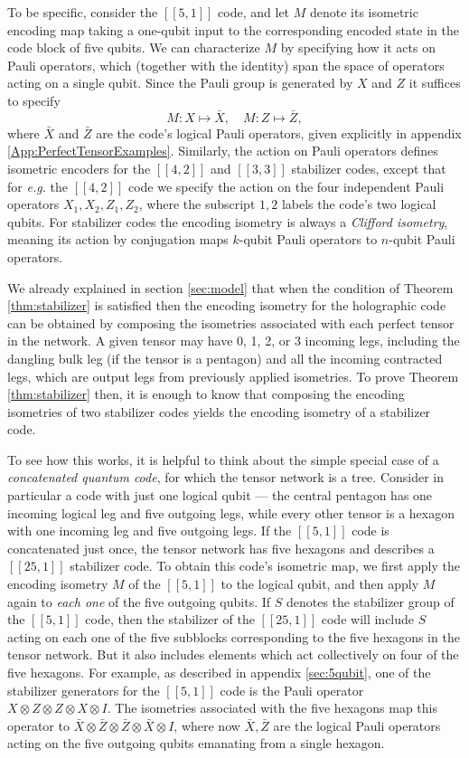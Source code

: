 \documentclass[12pt]{article}
\theoremstyle{plain}
\theoremstyle{plain}
\theoremstyle{plain}
\theoremstyle{plain}
\theoremstyle{result}
\theoremstyle{remark}
\theoremstyle{conjecture}
\theoremstyle{observation}
\theoremstyle{definition}
\theoremstyle{corollary}
\theoremstyle{definition}
\theoremstyle{definition}
\theoremstyle{assumption}
\theoremstyle{definition}
\theoremstyle{problem}
\theoremstyle{fact}
\newcommand{\be}{\begin{equation}}
\newcommand{\ee}{\end{equation}}
\begin{document}
To be specific, consider the $[[5,1]]$ code, and let $M$ denote its isometric encoding map taking a one-qubit input to the corresponding encoded state in the code block of five qubits. We can characterize $M$ by specifying how it acts on Pauli operators, which (together with the identity) span the space of operators acting on a single qubit. Since the Pauli group is generated by $X$ and $Z$ it suffices to specify
\be
M: X\mapsto \bar X,\quad M:Z \mapsto \bar Z,
\ee
where $\bar X$ and $\bar Z$ are the code's logical Pauli operators, given explicitly in appendix \ref{App:PerfectTensorExamples}. 
Similarly, the action on Pauli operators defines isometric encoders for the $[[4,2]]$ and $[[3,3]]$ stabilizer codes, except that for \textit{e.g.} the $[[4,2]]$ code we specify the action on the four independent Pauli operators $X_1,X_2,Z_1,Z_2$, where the subscript $1,2$ labels the code's two logical qubits. For stabilizer codes the encoding isometry is always a \textit{Clifford isometry}, meaning its action by conjugation maps $k$-qubit Pauli operators to $n$-qubit Pauli operators. 

We already explained in section \ref{sec:model} that when the condition of Theorem \ref{thm:stabilizer} is satisfied then the encoding isometry for the holographic code can be obtained by composing the isometries associated with each perfect tensor in the network. 
A given tensor may have 0, 1, 2, or 3 incoming legs, including the dangling bulk leg (if the tensor is a pentagon) and all the incoming contracted legs, which are output legs from previously applied isometries. 
To prove Theorem \ref{thm:stabilizer} then, it is enough to know that composing the encoding isometries of two stabilizer codes yields the encoding isometry of a stabilizer code. 

To see how this works, it is helpful to think about the simple special case of a \textit{concatenated quantum code}, for which the tensor network is a tree.
 Consider in particular a code with just one logical qubit --- the central pentagon has one incoming logical leg and five outgoing legs, while every other tensor is a hexagon with one incoming leg and five outgoing legs. 
 If the $[[5,1]]$ code is concatenated just once, the tensor network has five hexagons and describes a $[[25,1]]$ stabilizer code. 
To obtain this code's isometric map, we first apply the encoding isometry $M$ of the $[[5,1]]$ to the logical qubit, and then apply $M$ again to \textit{each one} of the five outgoing qubits. 
If $S$ denotes the stabilizer group of the $[[5,1]]$ code, then the stabilizer of the $[[25,1]]$ code will include $S$ acting on each one of the five subblocks corresponding to the five hexagons in the tensor network. 
But it also includes elements which act collectively on four of the five hexagons. For example, as described in appendix \ref{sec:5qubit}, one of the stabilizer generators for the $[[5,1]]$ code is the Pauli operator $X\otimes Z\otimes Z\otimes X\otimes I$.
 The isometries associated with the five hexagons map this operator to $\bar X\otimes \bar Z\otimes \bar Z\otimes \bar X\otimes I$, where now $\bar X,\bar Z$ are the logical Pauli operators acting on the five outgoing qubits emanating from a single hexagon.
\end{document}
